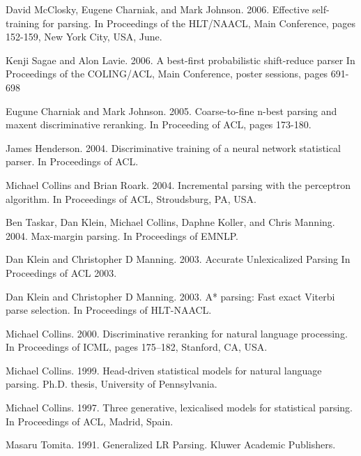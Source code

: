 \documentclass[11pt]{article}
\begin{document}
\begin{thebibliography}{Reference}
\newblock David McClosky, Eugene Charniak, and Mark Johnson. 2006.
\newblock Effective self-training for parsing.
\newblock In Proceedings of the HLT/NAACL, Main Conference, pages 152-159, New York City, USA, June.

\newblock Kenji Sagae and Alon Lavie. 2006.
\newblock A best-first probabilistic shift-reduce parser
\newblock In Proceedings of the COLING/ACL, Main Conference, poster sessions, pages 691-698

\newblock Eugune Charniak and Mark Johnson. 2005.
\newblock Coarse-to-fine n-best parsing and maxent discriminative reranking.
\newblock In Proceeding of ACL, pages 173-180.

\newblock James Henderson. 2004.
\newblock Discriminative training of a neural network statistical parser.
\newblock In Proceedings of ACL.

\newblock Michael Collins and Brian Roark. 2004.
\newblock Incremental parsing with the perceptron algorithm.
\newblock In Proceedings of ACL, Stroudsburg, PA, USA.

\newblock Ben Taskar, Dan Klein, Michael Collins, Daphne Koller, and Chris Manning. 2004.
\newblock Max-margin parsing.
\newblock In Proceedings of EMNLP.

\newblock Dan Klein and Christopher D Manning. 2003. 
\newblock Accurate Unlexicalized Parsing  
\newblock In Proceedings of ACL 2003.

\newblock Dan Klein and Christopher D Manning. 2003. 
\newblock A* parsing: Fast exact Viterbi parse selection. 
\newblock In Proceedings of HLT-NAACL.

\newblock Michael Collins. 2000.
\newblock Discriminative reranking for natural language processing.
\newblock In Proceedings of ICML, pages 175–182, Stanford, CA, USA.

\newblock Michael Collins. 1999.
\newblock Head-driven statistical models for natural language parsing. 
\newblock Ph.D. thesis, University of Pennsylvania.

\newblock Michael Collins. 1997.
\newblock Three generative, lexicalised models for statistical parsing. 
\newblock In Proceedings of ACL, Madrid, Spain.
 
\newblock Masaru Tomita. 1991.
\newblock Generalized LR Parsing.
\newblock Kluwer Academic Publishers.

\end{thebibliography}
\end{document}
